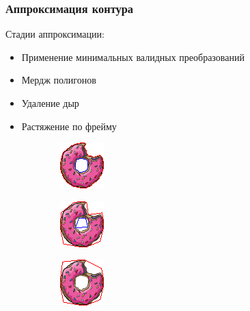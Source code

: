 \documentclass[10pt, unicode]{beamer}
\begin{document}
    \begin{frame}
        \frametitle{Аппроксимация контура}
        Стадии аппроксимации:
        \begin{itemize}
            \item Применение минимальных валидных преобразований
            \item Мердж полигонов
            \item Удаление дыр
            \item Растяжение по фрейму
        \end{itemize}
        \begin{figure}[H]
            \centering
            \begin{subfigure}[l]{0.33\linewidth}
                \centering
                \includegraphics[scale=1.5]{donutpixel_approx_start.png}
            \end{subfigure}
            \begin{subfigure}{0.33\linewidth}
                \centering
                \includegraphics[scale=1.5]{donutpixel_approx_mid.png}
            \end{subfigure}\begin{subfigure}{0.33\linewidth}
                \centering
                \includegraphics[scale=1.5]{donutpixel_approx_end.png}
            \end{subfigure}
        \end{figure}
    \end{frame}
\end{document}
